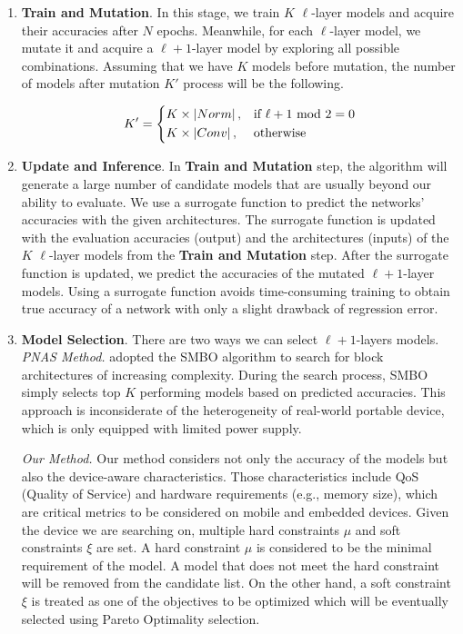 \documentclass[runningheads]{llncs}
\begin{document}
\begin{enumerate}
\item{\textbf{Train and Mutation}.} In this stage, we train $K$ $\ell$-layer models and acquire their accuracies after $N$ epochs. Meanwhile, for each $\ell$-layer model, we mutate it and acquire a $\ell+1$-layer model by exploring all possible combinations. Assuming that we have $K$ models before mutation, the number of models after mutation $K'$ process will be the following.

\begin{equation}\label{eq.mutation}
  {K}' =
  \begin{dcases}
  K \times \left | Norm \right |, & \text{if } \ell + 1 \text{ mod } 2 = 0 \\
  K \times \left | Conv \right |, & \text{otherwise}
  \end{dcases}
\end{equation}

\item{\textbf{Update and Inference}.} In \textbf{Train and Mutation} step, the algorithm will generate a large number of candidate models that are usually beyond our ability to evaluate. We use a surrogate function to predict the networks' accuracies with the given architectures. The surrogate function is updated with the evaluation accuracies (output) and the architectures (inputs) of the $K$ $\ell$-layer models from the \textbf{Train and Mutation} step. After the surrogate function is updated, we predict the accuracies of the mutated $\ell+1$-layer models. Using a surrogate function avoids time-consuming training to obtain true accuracy of a network with only a slight drawback of regression error.

\item{\textbf{Model Selection}.} There are two ways we can select $\ell+1$-layers models. \\
\textit{PNAS Method.} \cite{liu2017progressive} adopted the SMBO algorithm to search for block architectures of increasing complexity. During the search process, SMBO simply selects top $K$ performing models based on predicted accuracies. This approach is inconsiderate of the heterogeneity of real-world portable device, which is only equipped with limited power supply.

\textit{Our Method.} Our method considers not only the accuracy of the models but also the device-aware characteristics. Those characteristics include QoS (Quality of Service) and hardware requirements (e.g., memory size), which are critical metrics to be considered on mobile and embedded devices. Given the device we are searching on, multiple hard constraints $\mu$ and soft constraints $\xi$ are set. A hard constraint $\mu$ is considered to be the minimal requirement of the model. A model that does not meet the hard constraint will be removed from the candidate list. On the other hand, a soft constraint $\xi$ is treated as one of the objectives to be optimized which will be eventually selected using Pareto Optimality selection.

\end{enumerate}%
\end{document}
